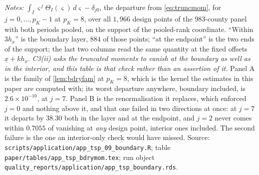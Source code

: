 \documentclass[
  12pt]{article}
\newcommand{\1}[1]{\mathds{1}\left[#1\right]}
\theoremstyle{plain}
\theoremstyle{definition}
\theoremstyle{definition}
\theoremstyle{remark}
\begin{document}
\begin{table}[!htbp]
\centering
\begin{threeparttable}
\caption{Truncated moments of the shipped boundary kernel, at every order C3(ii)
asks for}
\label{tab:supp-app-bdrymom}
\footnotesize

\begin{tablenotes}\footnotesize
\item \textit{Notes:}
$\int_I\varsigma^{\,j}\Theta_I(\varsigma)\,d\varsigma-\delta_{j0}$, the departure
from \eqref{eq:truncmom}, for $j=0,\dots,p_K-1$ at $p_K=8$, over all $1{,}966$
design points of the $983$-county panel with both periods pooled, on the support
of the pooled-rank coordinate. ``Within $3h_x$'' is the boundary layer, $884$ of
those points; ``at the endpoint'' is the two ends of the support; the last two
columns read the same quantity at the fixed offsets $\underline x+kh_x$.
\emph{C3(ii) asks the truncated moments to vanish at the boundary as well as in
the interior, and this table is that check rather than an assertion of it.}
Panel A is the family of \cref{lem:bdryfam} at $p_K=8$, which is the kernel the
estimates in this paper are computed with; its worst departure anywhere,
boundary included, is $2.6\times10^{-10}$, at $j=7$. Panel B is the
renormalisation it replaces, which enforced $j=0$ and nothing above it, and that
one failed in two directions at once: at $j=7$ it departs by $38.30$ both in the
layer and at the endpoint, and $j=2$ never comes within $0.7055$ of vanishing at
\emph{any} design point, interior ones included. The second failure is the one
an interior-only check would have missed. Source:
\texttt{scripts/application/app\_tsp\_09\_boundary.R}; table
\texttt{paper/tables/app\_tsp\_bdrymom.tex}; run object
\texttt{quality\_reports/application/app\_tsp\_boundary.rds}.
\end{tablenotes}
\end{threeparttable}
\end{table}
\end{document}
